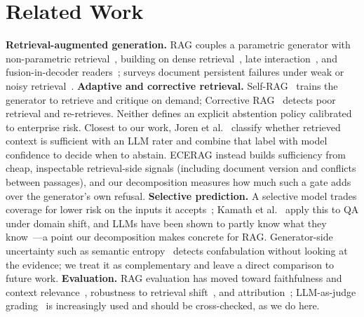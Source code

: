 \documentclass[conference,letterpaper]{IEEEtran}
\begin{document}
\section{Related Work}
\textbf{Retrieval-augmented generation.} RAG couples a parametric generator with non-parametric
retrieval~\cite{lewis2020rag}, building on dense retrieval~\cite{karpukhin2020dpr},
late interaction~\cite{khattab2020colbert}, and fusion-in-decoder
readers~\cite{izacard2021fid}; surveys document persistent failures under weak or noisy
retrieval~\cite{gao2023survey}. \textbf{Adaptive and corrective retrieval.}
Self-RAG~\cite{asai2023selfrag} trains the generator to retrieve and critique on demand;
Corrective RAG~\cite{yan2024crag} detects poor retrieval and re-retrieves. Neither defines an
explicit abstention policy calibrated to enterprise risk. Closest to our work, Joren et
al.~\cite{joren2025sufficient} classify whether retrieved context is sufficient with an LLM rater
and combine that label with model confidence to decide when to abstain. ECERAG instead
builds sufficiency from cheap, inspectable retrieval-side signals (including document version and
conflicts between passages), and our decomposition measures how much such a gate adds over the
generator's own refusal. \textbf{Selective prediction.} A
selective model trades coverage for lower risk on the inputs it accepts~\cite{elyaniv2010,geifman2019selectivenet};
Kamath et al.~\cite{kamath2020selective} apply this to QA under domain shift, and LLMs have been
shown to partly know what they know~\cite{kadavath2022know}---a point our decomposition makes
concrete for RAG. Generator-side uncertainty such as semantic entropy~\cite{farquhar2024semantic}
detects confabulation without looking at the evidence; we treat it as complementary and leave a
direct comparison to future work. \textbf{Evaluation.} RAG evaluation has moved toward faithfulness and context
relevance~\cite{es2023ragas}, robustness to retrieval shift~\cite{thakur2021beir}, and
attribution~\cite{bohnet2022attributed}; LLM-as-judge grading~\cite{zheng2023judge} is
increasingly used and should be cross-checked, as we do here.
\end{document}

